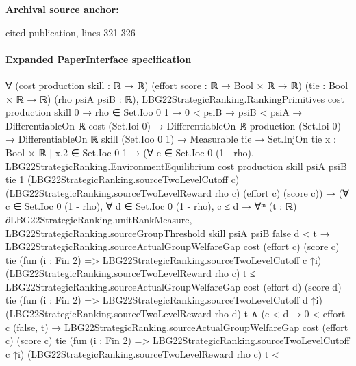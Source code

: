 \documentclass[10pt]{article}
\begin{document}
\textbf{Archival source anchor:} {\footnotesize\raggedright cited publication, lines 321-\allowbreak{}326\par}
\paragraph{Expanded PaperInterface specification}
\begin{ReviewVerbatim}
∀ (cost production skill : ℝ → ℝ) (effort score : ℝ → Bool × ℝ → ℝ) (tie : Bool × ℝ → ℝ) (rho psiA psiB : ℝ),
  LBG22StrategicRanking.RankingPrimitives cost production skill 0 →
    rho ∈ Set.Ioo 0 1 →
      0 < psiB →
        psiB < psiA →
          DifferentiableOn ℝ cost (Set.Ioi 0) →
            DifferentiableOn ℝ production (Set.Ioi 0) →
              DifferentiableOn ℝ skill (Set.Ioo 0 1) →
                Measurable tie →
                  Set.InjOn tie {x : Bool × ℝ | x.2 ∈ Set.Ioc 0 1} →
                    (∀ c ∈ Set.Ioc 0 (1 - rho),
                        LBG22StrategicRanking.EnvironmentEquilibrium cost production skill psiA psiB tie 1
                          (LBG22StrategicRanking.sourceTwoLevelCutoff c)
                          (LBG22StrategicRanking.sourceTwoLevelReward rho c) (effort c) (score c)) →
                      (∀ c ∈ Set.Ioc 0 (1 - rho),
                          ∀ d ∈ Set.Ioc 0 (1 - rho),
                            c ≤ d →
                              ∀ᵐ (t : ℝ) ∂LBG22StrategicRanking.unitRankMeasure,
                                LBG22StrategicRanking.sourceGroupThreshold skill psiA psiB false d < t →
                                  LBG22StrategicRanking.sourceActualGroupWelfareGap cost (effort c) (score c) tie
                                        (fun (i : Fin 2) => LBG22StrategicRanking.sourceTwoLevelCutoff c ↑i)
                                        (LBG22StrategicRanking.sourceTwoLevelReward rho c) t ≤
                                      LBG22StrategicRanking.sourceActualGroupWelfareGap cost (effort d) (score d) tie
                                        (fun (i : Fin 2) => LBG22StrategicRanking.sourceTwoLevelCutoff d ↑i)
                                        (LBG22StrategicRanking.sourceTwoLevelReward rho d) t ∧
                                    (c < d →
                                      0 < effort c (false, t) →
                                        LBG22StrategicRanking.sourceActualGroupWelfareGap cost (effort c) (score c) tie
                                            (fun (i : Fin 2) => LBG22StrategicRanking.sourceTwoLevelCutoff c ↑i)
                                            (LBG22StrategicRanking.sourceTwoLevelReward rho c) t <

\end{ReviewVerbatim}
\end{document}
